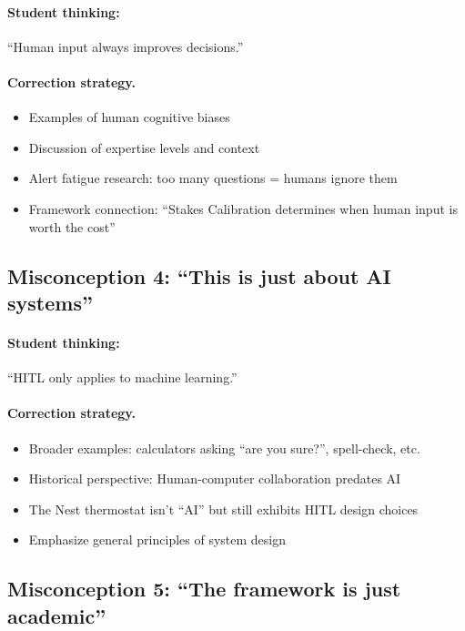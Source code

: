 \paragraph{Student thinking:} ``Human input always improves decisions.''

\paragraph{Correction strategy.}
\begin{itemize}
    \item Examples of human cognitive biases
    \item Discussion of expertise levels and context
    \item Alert fatigue research: too many questions = humans ignore them
    \item Framework connection: ``Stakes Calibration determines when human input is worth the cost''
\end{itemize}

\subsection{Misconception 4: ``This is just about AI systems''}

\paragraph{Student thinking:} ``HITL only applies to machine learning.''

\paragraph{Correction strategy.}
\begin{itemize}
    \item Broader examples: calculators asking ``are you sure?'', spell-check, etc.
    \item Historical perspective: Human-computer collaboration predates AI
    \item The Nest thermostat isn't ``AI'' but still exhibits HITL design choices
    \item Emphasize general principles of system design
\end{itemize}

\subsection{Misconception 5: ``The framework is just academic''}

